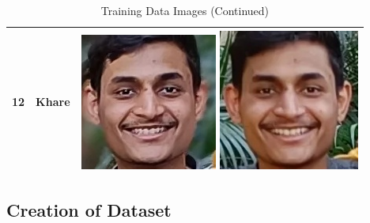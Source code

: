 \documentclass[openany]{report}
\begin{document}
\begin{table}[H]
\begin{tabular}{|c|c|c|}
        12                      & Khare         & \includegraphics[height=.15\textwidth]{../imgs/khare.jpg}
        \includegraphics[height=.15\textwidth]{../imgs/khare (32).jpg}
        \\
        \hline
    \end{tabular}
    \caption{Training Data Images (Continued)}
\end{table}

\subsection{Creation of Dataset}
\end{document}
